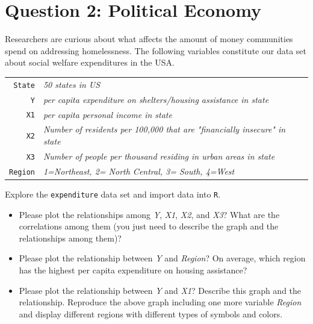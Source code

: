 \documentclass[12pt,letterpaper]{article}
\begin{document}
\newpage
	\section*{Question 2: Political Economy}

\noindent Researchers are curious about what affects the amount of money communities spend on addressing homelessness. The following variables constitute our data set about social welfare expenditures in the USA. \\
\vspace{.5cm}


\begin{tabular}{r|l}
	\texttt{State} &\emph{50 states in US} \\
	\texttt{Y} & \emph{per capita expenditure on shelters/housing assistance in state}\\
	\texttt{X1} &\emph{per capita personal income in state} \\
	\texttt{X2} &  \emph{Number of residents per 100,000 that are "financially insecure" in state}\\
	\texttt{X3} &  \emph{Number of people per thousand residing in urban areas in state} \\
	\texttt{Region} &  \emph{1=Northeast, 2= North Central, 3= South, 4=West} \\
\end{tabular}

\vspace{.5cm}
\noindent Explore the \texttt{expenditure} data set and import data into \texttt{R}.
\vspace{.5cm}
  
\vspace{.5cm}
\begin{itemize}

\item
Please plot the relationships among \emph{Y}, \emph{X1}, \emph{X2}, and \emph{X3}? What are the correlations among them (you just need to describe the graph and the relationships among them)?
\vspace{.5cm}
\item
Please plot the relationship between \emph{Y} and \emph{Region}? On average, which region has the highest per capita expenditure on housing assistance?
\vspace{.5cm}
\item
Please plot the relationship between \emph{Y} and \emph{X1}? Describe this graph and the relationship. Reproduce the above graph including one more variable \emph{Region} and display different regions with different types of symbols and colors.
\end{itemize}
\newpage
\end{document}
